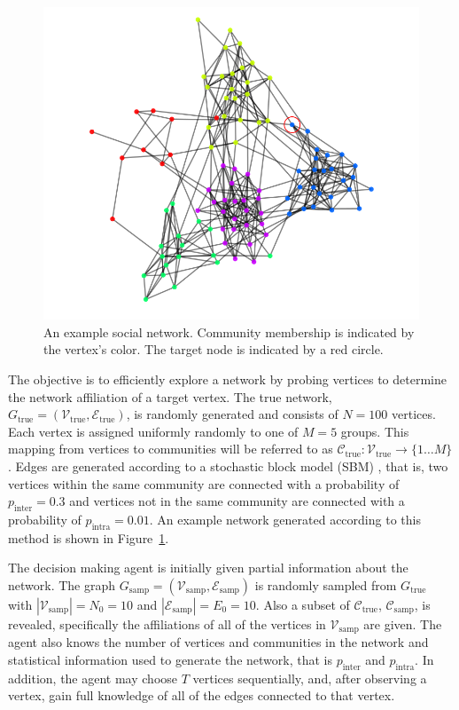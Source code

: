 \documentclass{IEEEtran}
\newcommand{\Gt}{\ensuremath{G_\text{true}}}
\newcommand{\Nt}{\ensuremath{\mathcal{V}_\text{true}}}
\newcommand{\Et}{\ensuremath{\mathcal{E}_\text{true}}}
\newcommand{\Comt}{\ensuremath{\mathcal{C}_\text{true}}}
\newcommand{\Gs}{\ensuremath{G_\text{samp}}}
\newcommand{\Ns}{\ensuremath{\mathcal{V}_\text{samp}}}
\newcommand{\Es}{\ensuremath{\mathcal{E}_\text{samp}}}
\newcommand{\Coms}{\ensuremath{\mathcal{C}_\text{samp}}}
\begin{document}
\begin{figure}[tb]
    \centering
    \includegraphics[width=\columnwidth]{network.png}
    \caption{An example social network. Community membership is indicated by the vertex's color. The target node is indicated by a red circle.}
    \label{fig:network}
\end{figure}

The objective is to efficiently explore a network by probing vertices to determine the network affiliation of a target vertex. The true network, $\Gt = (\Nt, \Et)$, is randomly generated and consists of $N=100$ vertices. Each vertex is assigned uniformly randomly to one of $M=5$ groups. This mapping from vertices to communities will be referred to as $\Comt : \Nt \to \{1\dots M\}$. Edges are generated according to a stochastic block model (SBM) \cite{Wang1987}, that is, two vertices within the same community are connected with a probability of $p_\text{inter} = 0.3$ and vertices not in the same community are connected with a probability of $p_\text{intra} =0.01$. An example network generated according to this method is shown in Figure~\ref{fig:network}.

The decision making agent is initially given partial information about the network. The graph $\Gs = (\Ns, \Es)$ is randomly sampled from $\Gt$ with $|\Ns| = N_0 = 10$ and $|\Es| = E_0 = 10$. Also a subset of $\Comt$, $\Coms$, is revealed, specifically the affiliations of all of the vertices in $\Ns$ are given. The agent also knows the number of vertices and communities in the network and statistical information used to generate the network, that is $p_\text{inter}$ and $p_\text{intra}$. In addition, the agent may choose $T$ vertices sequentially, and, after observing a vertex, gain full knowledge of all of the edges connected to that vertex.
\end{document}
